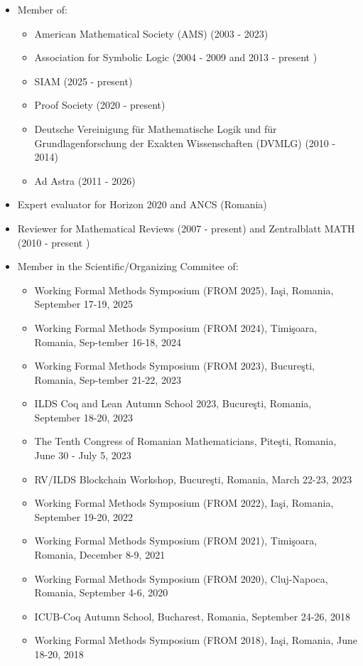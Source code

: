 \documentclass[12pt]{article}
\begin{document}
\begin{itemize}
\item Member of:
\begin{itemize}
\item American Mathematical Society (AMS) (2003 - 2023)
\item Association for Symbolic Logic (2004 - 2009 and 2013 - present )
\item SIAM (2025 - present)
\item Proof Society (2020 - present)
\item Deutsche Vereinigung f\" ur Mathematische Logik und f\" ur Grundlagenforschung der Exakten Wissenschaften  (DVMLG) (2010 - 2014)
\item Ad Astra (2011 - 2026)
\end{itemize}
\item Expert evaluator for Horizon 2020 and ANCS (Romania)
\item Reviewer for Mathematical Reviews (2007 -  present) and Zentralblatt MATH (2010 - present )
\item Member in the Scientific/Organizing Commitee of:
\begin{itemize}
\item Working Formal Methods Symposium (FROM 2025), Ia\c{s}i, Romania, September 17-19, 2025
\item Working Formal Methods Symposium (FROM 2024), Timi\c{s}oara, Romania, Sep-tember 16-18, 2024 
\item Working Formal Methods Symposium (FROM 2023), Bucure\c{s}ti, Romania, Sep-tember 21-22, 2023 
\item ILDS Coq and Lean Autumn School 2023, Bucure\c{s}ti, Romania, September 18-20, 2023
\item The Tenth Congress of Romanian Mathematicians, Pite\c{s}ti, Romania, June 30 - July 5, 2023
\item RV/ILDS Blockchain Workshop, Bucure\c{s}ti, Romania, March 22-23, 2023
\item Working Formal Methods Symposium (FROM 2022), Ia\c{s}i, Romania, September 19-20, 2022
\item Working Formal Methods Symposium (FROM 2021), Timi\c{s}oara, Romania, December 8-9, 2021
\item Working Formal Methods Symposium (FROM 2020), Cluj-Napoca, Romania, September 4-6, 2020
\item ICUB-Coq Autumn School, Bucharest, Romania, September 24-26, 2018
\item Working Formal Methods Symposium (FROM 2018),  Ia\c{s}i, Romania, June 18-20,  2018

\end{itemize}
\end{itemize}
\end{document}
